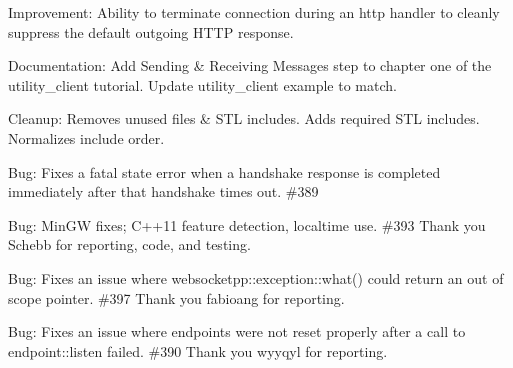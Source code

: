 \begin{DoxyItemize}
\item Improvement\+: Ability to terminate connection during an http handler to cleanly suppress the default outgoing H\+T\+TP response.
\item Documentation\+: Add Sending \& Receiving Messages step to chapter one of the {\ttfamily utility\+\_\+client} tutorial. Update {\ttfamily utility\+\_\+client} example to match.
\item Cleanup\+: Removes unused files \& S\+TL includes. Adds required S\+TL includes. Normalizes include order.
\item Bug\+: Fixes a fatal state error when a handshake response is completed immediately after that handshake times out. \#389
\item Bug\+: Min\+GW fixes; C++11 feature detection, localtime use. \#393 Thank you Schebb for reporting, code, and testing.
\item Bug\+: Fixes an issue where {\ttfamily websocketpp\+::exception\+::what()} could return an out of scope pointer. \#397 Thank you fabioang for reporting.
\item Bug\+: Fixes an issue where endpoints were not reset properly after a call to {\ttfamily endpoint\+::listen} failed. \#390 Thank you wyyqyl for reporting.
\end{DoxyItemize}

